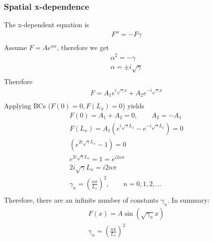 \documentclass[11pt]{article}
\begin{document}
\subsubsection{Spatial x-dependence}
The x-dependent equation is
\begin{equation}\begin{aligned}
 F'' = - F \gamma \\
\end{aligned} \end{equation}
Assume $F = Ae^{\alpha x}$, therefore we get
\begin{equation}\begin{aligned}
 \alpha^2 = - \gamma \\
 \alpha = \pm i \sqrt{\gamma} \\
\end{aligned} \end{equation}
Therefore
\begin{equation}\begin{aligned}
 F = A_1 e^{i\sqrt{\gamma} x} + A_2 e^{-i\sqrt{\gamma} x} \\
\end{aligned} \end{equation}
Applying BCs ($F(0)=0,F(L_x)=0$) yields
\begin{equation}\begin{aligned}
 F(0) = A_1 + A_2 = 0, \qquad A_2 = -A_1 \\
 F(L_x) = A_1 \left( e^{i\sqrt{\gamma} L_x} - e^{-i\sqrt{\gamma} L_x} \right) = 0 \\
              \left( e^{2i\sqrt{\gamma} L_x} - 1 \right) = 0 \\
              e^{2i\sqrt{\gamma} L_x} = 1 = e^{i2n\pi} \\
 2i\sqrt{\gamma} L_x = i2n\pi \\
 \gamma_n = \left( \frac{n\pi}{L_x} \right)^2, \qquad n=0,1,2,... \\
\end{aligned} \end{equation}
Therefore, there are an infinite number of constants $\gamma_n$. In summary:
\begin{equation}\begin{aligned}
 F(x) = A \sin(\sqrt{\gamma_n} x) \\
 \gamma_n = \left( \frac{n\pi}{L_x} \right)^2 \\
\end{aligned} \end{equation}
\end{document}
